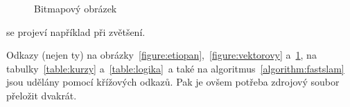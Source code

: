 \documentclass[a4paper, 11pt]{article}
\begin{document}
	\begin{figure}[h]
		\centering
		\caption{Bitmapový obrázek}
		\label{figure:rastrovy}
	\end{figure}
	\bigskip
	\noindent se projeví například při zvětšení.

	Odkazy (nejen ty) na obrázky~\ref{figure:etiopan},~\ref{figure:vektorovy} a~\ref{figure:rastrovy}, na
	tabulky~\ref{table:kurzy} a~\ref{table:logika}~a také na algoritmus~\ref{algorithm:fastslam} jsou
	udělány pomocí křížových odkazů. Pak je ovšem potřeba zdrojový soubor přeložit dvakrát.
\end{document}
